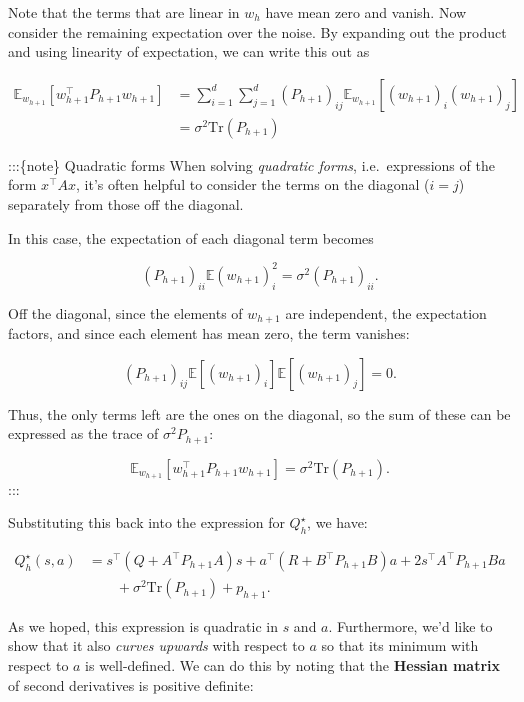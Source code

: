 \documentclass[
  letterpaper,
  DIV=11,
  numbers=noendperiod]{scrreprt}
\theoremstyle{plain}
\theoremstyle{plain}
\theoremstyle{definition}
\theoremstyle{definition}
\theoremstyle{remark}
\begin{document}
Note that the terms that are linear in \(w_h\) have mean zero and
vanish. Now consider the remaining expectation over the noise. By
expanding out the product and using linearity of expectation, we can
write this out as

\[
\begin{aligned}
    \mathbb{E}_{w_{h+1}} [w_{h+1}^\top P_{h+1} w_{h+1}] & = \sum_{i=1}^d \sum_{j=1}^d (P_{h+1})_{ij} \mathbb{E}_{w_{h+1}} [(w_{h+1})_i (w_{h+1})_j] \\
    & = \sigma^2 \mathrm{Tr}(P_{h+ 1})
\end{aligned}
\]

:::\{note\} Quadratic forms When solving \emph{quadratic forms},
i.e.~expressions of the form \(x^\top A x\), it's often helpful to
consider the terms on the diagonal (\(i = j\)) separately from those off
the diagonal.

In this case, the expectation of each diagonal term becomes

\[
(P_{h+1})_{ii} \mathbb{E}(w_{h+1})_i^2 = \sigma^2 (P_{h+1})_{ii}.
\]

Off the diagonal, since the elements of \(w_{h+1}\) are independent, the
expectation factors, and since each element has mean zero, the term
vanishes:

\[
(P_{h+1})_{ij} \mathbb{E}[(w_{h+1})_i] \mathbb{E}[(w_{h+1})_j] = 0.
\]

Thus, the only terms left are the ones on the diagonal, so the sum of
these can be expressed as the trace of \(\sigma^2 P_{h+1}\):

\[
\mathbb{E}_{w_{h+1}} [w_{h+1}^\top P_{h+1} w_{h+1}] = \sigma^2 \mathrm{Tr}(P_{h+1}).
\] :::

Substituting this back into the expression for \(Q^\star_h\), we have:

\[
\begin{aligned}
    Q^\star_h(s, a) & = s^\top (Q + A^\top P_{h+1} A) s+ a^\top (R + B^\top P_{h+1} B) a
    + 2s^\top A^\top P_{h+1} B a\\
                            & \qquad + \sigma^2 \mathrm{Tr}(P_{h+1}) + p_{h+1}.
\end{aligned}
\]

As we hoped, this expression is quadratic in \(s\) and \(a\).
Furthermore, we'd like to show that it also \emph{curves upwards} with
respect to \(a\) so that its minimum with respect to \(a\) is
well-defined. We can do this by noting that the \textbf{Hessian matrix}
of second derivatives is positive definite:
\end{document}
